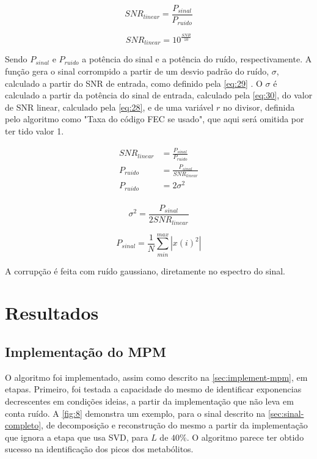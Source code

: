 \documentclass[12pt]{article}
\begin{document}
\begin{equation} \label{eq:26}
    SNR_{linear} = \frac{P_{sinal}}{P_{ruido}}
\end{equation}

\begin{equation} \label{eq:28}
    SNR_{linear} = 10^{\frac{SNR}{10}}
\end{equation}

Sendo $P_{sinal}$ e $P_{ruido}$ a potência do sinal e a potência do ruído, respectivamente. A função gera o sinal corrompido a partir 
de um desvio padrão do ruído, $\sigma$, calculado a partir do SNR de entrada, como definido pela \autoref{eq:29} \cite{Viswanathan2019-rj}. 
O $\sigma$ é calculado a partir da potência do sinal de entrada, calculado pela \autoref{eq:30}, do valor de SNR linear, calculado pela 
\autoref{eq:28}, e de uma variável $r$ no divisor, definida pelo algoritmo como "Taxa do código FEC se usado", que aqui será omitida por 
ter tido valor 1.

\begin{equation} \label{eq:31}
    \begin{aligned}
        SNR_{linear} & = \frac{P_{sinal}}{P_{ruido}} \\
        P_{ruido} & = \frac{P_{sinal}}{SNR_{linear}} \\
        P_{ruido} & = 2\sigma^2 \\
    \end{aligned}
\end{equation}

\begin{equation} \label{eq:29}
    \sigma^2 = \frac{P_{sinal}}{2 SNR_{linear}}
\end{equation}

\begin{equation} \label{eq:30}
    P_{sinal} = \frac{1}{N} \sum_{min}^{max} |x(i)^2|
\end{equation}

A corrupção é feita com ruído gaussiano, diretamente no espectro do sinal.


\section{Resultados}

\subsection{Implementação do MPM}

O algoritmo foi implementado, assim como descrito na \autoref{sec:implement-mpm}, em etapas. Primeiro, foi testada a capacidade do mesmo 
de identificar exponencias decrescentes em condições ideias, a partir da implementação que não leva em conta ruído. A \autoref{fig:8} 
demonstra um exemplo, para o sinal descrito na \autoref{sec:sinal-completo}, de decomposição e reconstrução do mesmo a partir da implementação
que ignora a etapa que usa SVD, para $L$ de $40\%$. O algoritmo parece ter obtido sucesso na identificação dos picos dos metabólitos.
\end{document}

